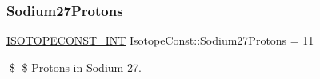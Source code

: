 \subsubsection{\texorpdfstring{Sodium27\+Protons}{Sodium27Protons}}
{\footnotesize\ttfamily \mbox{\hyperlink{group___isotope_const-_macros_ga5f18360b3e99483a35c32d789e62621c}{I\+S\+O\+T\+O\+P\+E\+C\+O\+N\+S\+T\+\_\+\+I\+NT}} Isotope\+Const\+::\+Sodium27\+Protons = 11}

\$ \$ Protons in Sodium-\/27. 